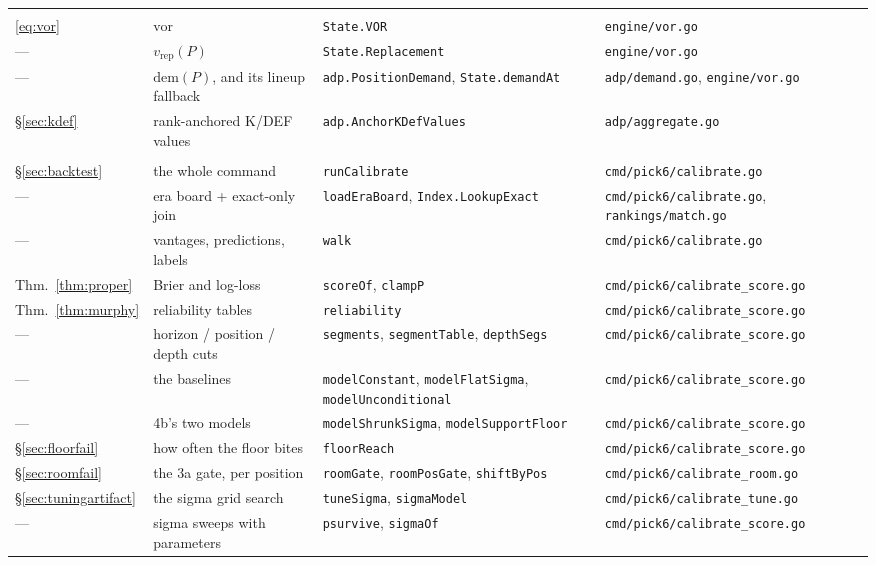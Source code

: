 \documentclass[10pt,a4paper]{article}
\theoremstyle{plain}
\theoremstyle{definition}
\theoremstyle{remark}
\newcommand{\code}[1]{\texttt{\small #1}}
\begin{document}
\begin{longtable}{@{}p{}p{}p{}p{}@{}}
\addlinespace
\multicolumn{4}{@{}l}{\emph{Value over replacement, K/DEF}}\\[0.2em]
\eqref{eq:vor} & $\mathrm{vor}$ & \code{State.VOR} & \code{engine/vor.go} \\
--- & $v_{\mathrm{rep}}(P)$ & \code{State.Replacement} & \code{engine/vor.go} \\
--- & $\mathrm{dem}(P)$, and its lineup fallback & \code{adp.PositionDemand}, \code{State.demandAt} & \code{adp/demand.go}, \code{engine/vor.go} \\
\S\ref{sec:kdef} & rank-anchored K/DEF values & \code{adp.AnchorKDefValues} & \code{adp/aggregate.go} \\

\addlinespace
\multicolumn{4}{@{}l}{\emph{Backtest}}\\[0.2em]
\S\ref{sec:backtest} & the whole command & \code{runCalibrate} & \code{cmd/pick6/calibrate.go} \\
--- & era board + exact-only join & \code{loadEraBoard}, \code{Index.LookupExact} & \code{cmd/pick6/calibrate.go}, \code{rankings/match.go} \\
--- & vantages, predictions, labels & \code{walk} & \code{cmd/pick6/calibrate.go} \\
Thm.~\ref{thm:proper} & Brier and log-loss & \code{scoreOf}, \code{clampP} & \code{cmd/pick6/calibrate\_score.go} \\
Thm.~\ref{thm:murphy} & reliability tables & \code{reliability} & \code{cmd/pick6/calibrate\_score.go} \\
--- & horizon / position / depth cuts & \code{segments}, \code{segmentTable}, \code{depthSegs} & \code{cmd/pick6/calibrate\_score.go} \\
--- & the baselines & \code{modelConstant}, \code{modelFlatSigma}, \code{modelUnconditional} & \code{cmd/pick6/calibrate\_score.go} \\
--- & 4b's two models & \code{modelShrunkSigma}, \code{modelSupportFloor} & \code{cmd/pick6/calibrate\_score.go} \\
\S\ref{sec:floorfail} & how often the floor bites & \code{floorReach} & \code{cmd/pick6/calibrate\_score.go} \\
\S\ref{sec:roomfail} & the 3a gate, per position & \code{roomGate}, \code{roomPosGate}, \code{shiftByPos} & \code{cmd/pick6/calibrate\_room.go} \\
\S\ref{sec:tuningartifact} & the sigma grid search & \code{tuneSigma}, \code{sigmaModel} & \code{cmd/pick6/calibrate\_tune.go} \\
--- & sigma sweeps with parameters & \code{psurvive}, \code{sigmaOf} & \code{cmd/pick6/calibrate\_score.go} \\
\bottomrule
\end{longtable}
\endgroup
\end{document}
